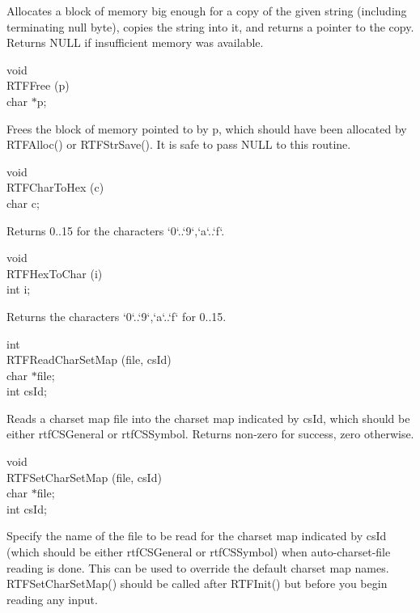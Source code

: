 \documentclass{article}
\begin{document}
\noindent
Allocates a block of memory big enough for a copy of the given string (including 
terminating null byte), copies the string into it, and returns a pointer 
to the copy. Returns NULL if insufficient memory was available.




\noindent
void\\
RTFFree (p)\\
char	$\ast $p;




\noindent
Frees the block of memory pointed to by p, which should have been allocated 
by RTFAlloc() or RTFStrSave(). It is safe to pass NULL to this routine.




\noindent
void\\
RTFCharToHex (c)\\
char	c;




\noindent
Returns 0..15 for the characters `0`..`9`,`a`..`f`.




\noindent
void\\
RTFHexToChar (i)\\
int	i;




\noindent
Returns the characters `0`..`9`,`a`..`f` for 0..15.




\noindent
int\\
RTFReadCharSetMap (file, csId)\\
char	$\ast $file;\\
int	csId;




\noindent
Reads a charset map file into the charset map indicated by csId, which should 
be either rtfCSGeneral or rtfCSSymbol. Returns non-zero for success, zero 
otherwise.




\noindent
void\\
RTFSetCharSetMap (file, csId)\\
char	$\ast $file;\\
int	csId;




\noindent
Specify the name of the file to be read for the charset map indicated by 
csId (which should be either rtfCSGeneral or rtfCSSymbol) when auto-charset-file 
reading is done. This can be used to override the default charset map names. 
RTFSetCharSetMap() should be called after RTFInit() but before you begin 
reading any input.
\end{document}
